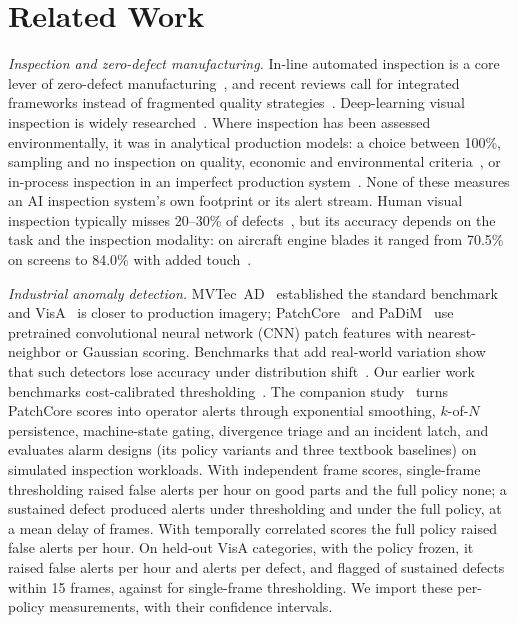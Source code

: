 \section{Related Work}
\emph{Inspection and zero-defect manufacturing.} In-line automated inspection is a core lever of zero-defect manufacturing~\cite{psarommatis2019zero,azamfirei2023automation}, and recent reviews call for integrated frameworks instead of fragmented quality strategies~\cite{psarommatis2024zdm}. Deep-learning visual inspection is widely researched~\cite{hutten2024deep}. Where inspection has been assessed environmentally, it was in analytical production models: a choice between 100\%, sampling and no inspection on quality, economic and environmental criteria~\cite{afrinaldi2020selecting}, or in-process inspection in an imperfect production system~\cite{yadav2025effect}. None of these measures an AI inspection system's own footprint or its alert stream. Human visual inspection typically misses 20--30\% of defects~\cite{see2012visual}, but its accuracy depends on the task and the inspection modality: on aircraft engine blades it ranged from 70.5\% on screens to 84.0\% with added touch~\cite{aust2021comparison}.

\emph{Industrial anomaly detection.} MVTec~AD~\cite{bergmann2021mvtec} established the standard benchmark and VisA~\cite{zou2022visa} is closer to production imagery; PatchCore~\cite{roth2022patchcore} and PaDiM~\cite{defard2021padim} use pretrained convolutional neural network (CNN) patch features with nearest-neighbor or Gaussian scoring. Benchmarks that add real-world variation show that such detectors lose accuracy under distribution shift~\cite{pemula2025robust}. Our earlier work benchmarks cost-calibrated thresholding~\cite{sengar2026flagship1}. The companion study~\cite{sengar2026paperA} turns PatchCore scores into operator alerts through exponential smoothing, $k$-of-$N$ persistence, machine-state gating, divergence triage and an incident latch, and evaluates \PaperANumPolicies{} alarm designs (its policy variants and three textbook baselines) on simulated inspection workloads. With independent frame scores, single-frame thresholding raised \PaperAFaRaw{} false alerts per hour on good parts and the full policy none; a sustained defect produced \PaperAPerDefectRaw{} alerts under thresholding and \PaperAPerDefectFull{} under the full policy, at a mean delay of \PaperADelay{} frames. With temporally correlated scores the full policy raised \PaperACorrFaFull{} false alerts per hour. On \PaperAVisaCategories{} held-out VisA categories, with the policy frozen, it raised \PaperAVisaFaFull{} false alerts per hour and \PaperAVisaPerDefectFull{} alerts per defect, and flagged \PaperAVisaRecallFull{} of sustained defects within 15 frames, against \PaperAVisaRecallRaw{} for single-frame thresholding. We import these per-policy measurements, with their confidence intervals.


